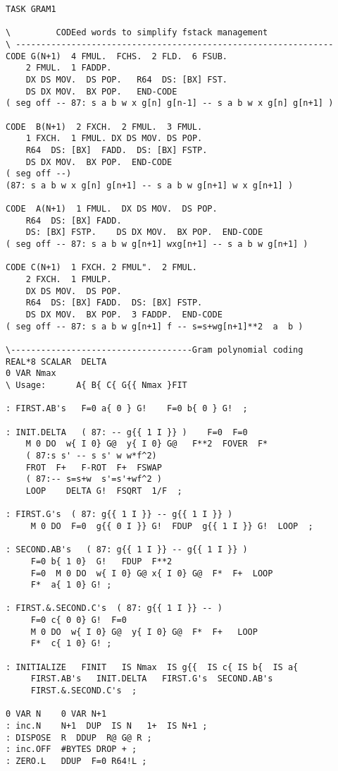 \begin{lstlisting}
TASK GRAM1

\         CODEed words to simplify fstack management
\ ---------------------------------------------------------------
CODE G(N+1)  4 FMUL.  FCHS.  2 FLD.  6 FSUB.
    2 FMUL.  1 FADDP.
    DX DS MOV.  DS POP.   R64  DS: [BX] FST.
    DS DX MOV.  BX POP.   END-CODE
( seg off -- 87: s a b w x g[n] g[n-1] -- s a b w x g[n] g[n+1] )

CODE  B(N+1)  2 FXCH.  2 FMUL.  3 FMUL.
    1 FXCH.  1 FMUL. DX DS MOV. DS POP.
    R64  DS: [BX]  FADD.  DS: [BX] FSTP.
    DS DX MOV.  BX POP.  END-CODE
( seg off --)
(87: s a b w x g[n] g[n+1] -- s a b w g[n+1] w x g[n+1] )

CODE  A(N+1)  1 FMUL.  DX DS MOV.  DS POP.
    R64  DS: [BX] FADD.
    DS: [BX] FSTP.    DS DX MOV.  BX POP.  END-CODE
( seg off -- 87: s a b w g[n+1] wxg[n+1] -- s a b w g[n+1] )

CODE C(N+1)  1 FXCH. 2 FMUL".  2 FMUL.
    2 FXCH.  1 FMULP.
    DX DS MOV.  DS POP.
    R64  DS: [BX] FADD.  DS: [BX] FSTP.
    DS DX MOV.  BX POP.  3 FADDP.  END-CODE
( seg off -- 87: s a b w g[n+1] f -- s=s+wg[n+1]**2  a  b )

\------------------------------------Gram polynomial coding
REAL*8 SCALAR  DELTA
0 VAR Nmax
\ Usage:      A{ B{ C{ G{{ Nmax }FIT

: FIRST.AB's   F=0 a{ 0 } G!    F=0 b{ 0 } G!  ;

: INIT.DELTA   ( 87: -- g{{ 1 I }} )    F=0  F=0
    M 0 DO  w{ I 0} G@  y{ I 0} G@   F**2  FOVER  F* 
    ( 87:s s' -- s s' w w*f^2)
    FROT  F+   F-ROT  F+  FSWAP
    ( 87:-- s=s+w  s'=s'+wf^2 )
    LOOP    DELTA G!  FSQRT  1/F  ;

: FIRST.G's  ( 87: g{{ 1 I }} -- g{{ 1 I }} ) 
     M 0 DO  F=0  g{{ 0 I }} G!  FDUP  g{{ 1 I }} G!  LOOP  ;

: SECOND.AB's   ( 87: g{{ 1 I }} -- g{{ 1 I }} )
     F=0 b{ 1 0}  G!   FDUP  F**2
     F=0  M 0 DO  w{ I 0} G@ x{ I 0} G@  F*  F+  LOOP  
     F*  a{ 1 0} G! ;

: FIRST.&.SECOND.C's  ( 87: g{{ 1 I }} -- )
     F=0 c{ 0 0} G!  F=0
     M 0 DO  w{ I 0} G@  y{ I 0} G@  F*  F+   LOOP
     F*  c{ 1 0} G! ;

: INITIALIZE   FINIT   IS Nmax  IS g{{  IS c{ IS b{  IS a{
     FIRST.AB's   INIT.DELTA   FIRST.G's  SECOND.AB's
     FIRST.&.SECOND.C's  ;

0 VAR N    0 VAR N+1
: inc.N    N+1  DUP  IS N   1+  IS N+1 ;
: DISPOSE  R  DDUP  R@ G@ R ;
: inc.OFF  #BYTES DROP + ;
: ZERO.L   DDUP  F=0 R64!L ;


\end{lstlisting}
